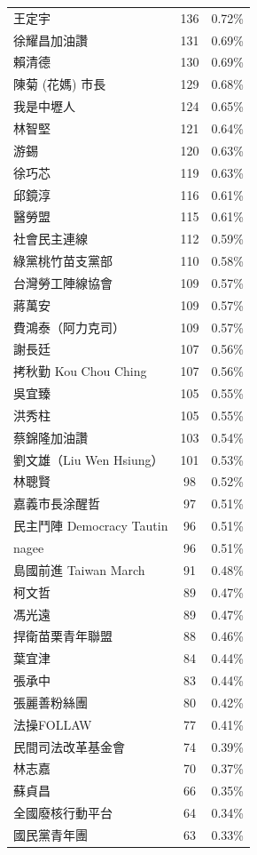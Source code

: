 \documentclass[a4paper, 10pt, conference]{ieeeconf}       %
\begin{document}
\begin{CJK}{UTF8}{bsmi}
\begin{longtable}[c]{@{}lcc@{}}
王定宇 & 136 & 0.72\% \\
徐耀昌加油讚 & 131 & 0.69\% \\
賴清德 & 130 & 0.69\% \\
陳菊 (花媽) 市長 & 129 & 0.68\% \\
我是中壢人 & 124 & 0.65\% \\
林智堅 & 121 & 0.64\% \\
游錫\charkun{} & 120 & 0.63\% \\
徐巧芯 & 119 & 0.63\% \\
邱鏡淳 & 116 & 0.61\% \\
醫勞盟 & 115 & 0.61\% \\
社會民主連線 & 112 & 0.59\% \\
綠黨桃竹苗支黨部 & 110 & 0.58\% \\
台灣勞工陣線協會 & 109 & 0.57\% \\
蔣萬安 & 109 & 0.57\% \\
費鴻泰（阿力克司） & 109 & 0.57\% \\
謝長廷 & 107 & 0.56\% \\
拷秋勤 Kou Chou Ching & 107 & 0.56\% \\
吳宜臻 & 105 & 0.55\% \\
洪秀柱 & 105 & 0.55\% \\
蔡錦隆加油讚 & 103 & 0.54\% \\
劉文雄（Liu Wen Hsiung） & 101 & 0.53\% \\
林聰賢 & 98 & 0.52\% \\
嘉義市長涂醒哲 & 97 & 0.51\% \\
民主鬥陣 Democracy Tautin & 96 & 0.51\% \\
nagee & 96 & 0.51\% \\
島國前進 Taiwan March & 91 & 0.48\% \\
柯文哲 & 89 & 0.47\% \\
馮光遠 & 89 & 0.47\% \\
捍衛苗栗青年聯盟 & 88 & 0.46\% \\
葉宜津 & 84 & 0.44\% \\
張承中 & 83 & 0.44\% \\
張麗善粉絲團 & 80 & 0.42\% \\
法操FOLLAW & 77 & 0.41\% \\
民間司法改革基金會 & 74 & 0.39\% \\
林志嘉 & 70 & 0.37\% \\
蘇貞昌 & 66 & 0.35\% \\
全國廢核行動平台 & 64 & 0.34\% \\
國民黨青年團 & 63 & 0.33\% \\

\end{longtable}
\end{CJK}
\end{document}
